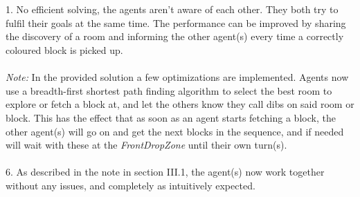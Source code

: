 \documentclass[10pt,a4paper]{article}
\begin{document}
\part{}
1. No efficient solving, the agents aren't aware of each other. They both try to fulfil their goals at the same time. 
The performance can be improved by sharing the discovery of a room and informing the other agent(s) every time a correctly coloured block is picked up.\\
\\
\emph{Note:} In the provided solution a few optimizations are implemented. Agents now use a breadth-first shortest path finding algorithm to select the best room to explore or fetch a block at, and let the others know they call dibs on said room or block. This has the effect that as soon as an agent starts fetching a block, the other agent(s) will go on and get the next blocks in the sequence, and if needed will wait with these at the \emph{FrontDropZone} until their own turn(s).\\
\\
6. As described in the note in section III.1, the agent(s) now work together without any issues, and completely as intuitively expected.
\end{document}
